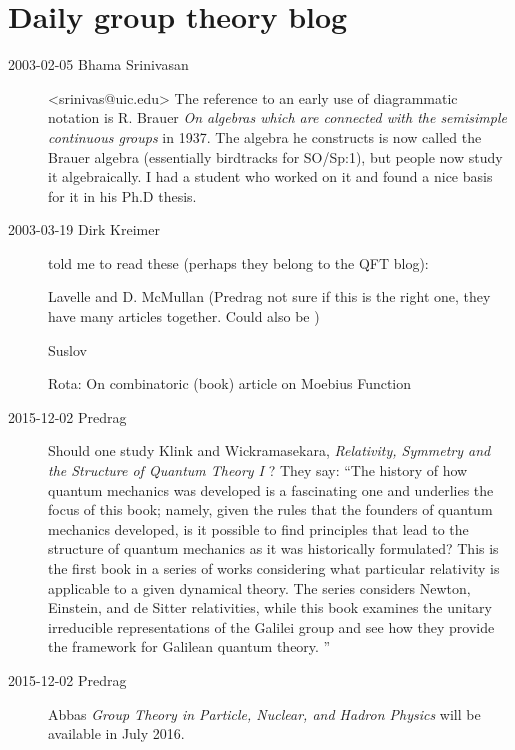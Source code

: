 

\chapter{Daily group theory blog}
\label{s-groupTheBlog}



\begin{description}

\item[2003-02-05  Bhama Srinivasan] <srinivas@uic.edu>
The reference to an early use of diagrammatic notation is R.
Brauer {\em On algebras which are connected with the
semisimple continuous groups} in 1937. The algebra he constructs is now
called the Brauer algebra (essentially birdtracks for SO/Sp:1), but people
now study it algebraically. I had a student who worked on it and found a nice
basis for it in his Ph.D thesis.

\item[2003-03-19  Dirk Kreimer] told me to
read these (perhaps they belong to the QFT blog):

Lavelle and D. McMullan
(Predrag not sure if this is the right one, they have many articles together.
Could also be )

Suslov

Rota: On combinatoric (book)
	article on Moebius Function


\item[2015-12-02  Predrag]
Should one study
Klink and Wickramasekara,
{\em Relativity, Symmetry and the Structure of Quantum Theory I} ?
They say: ``The history of how quantum mechanics was developed is a
fascinating one and underlies the focus of this book; namely, given the
rules that the founders of quantum mechanics developed, is it possible to
find principles that lead to the structure of quantum mechanics as it was
historically formulated? This is the first book in a series of works
considering what particular relativity is applicable to a given dynamical
theory. The series considers Newton, Einstein, and de Sitter
relativities, while this book examines the unitary irreducible
representations of the Galilei group and see how they provide the
framework for Galilean quantum theory.
''

\item[2015-12-02  Predrag] Abbas {\em Group Theory
in Particle, Nuclear, and Hadron Physics} will be available in July 2016.


\end{description}
